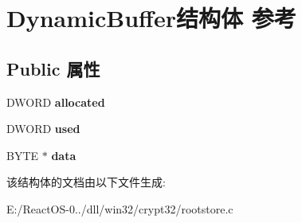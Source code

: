 \hypertarget{struct_dynamic_buffer}{}\section{Dynamic\+Buffer结构体 参考}
\label{struct_dynamic_buffer}
\subsection*{Public 属性}
\begin{DoxyCompactItemize}
\item 
\mbox{\label{struct_dynamic_buffer_a421dc28765bb8e5a05018b75410aa506}} 
D\+W\+O\+RD {\bfseries allocated}
\item 
\mbox{\label{struct_dynamic_buffer_a59c03c940a19fb26ac9ef0d2b4043876}} 
D\+W\+O\+RD {\bfseries used}
\item 
\mbox{\label{struct_dynamic_buffer_a6821db8b5987fcc2e70f1591081f115b}} 
B\+Y\+TE $\ast$ {\bfseries data}
\end{DoxyCompactItemize}


该结构体的文档由以下文件生成\+:\begin{DoxyCompactItemize}
\item 
E\+:/\+React\+O\+S-\/0../dll/win32/crypt32/rootstore.\+c\end{DoxyCompactItemize}
